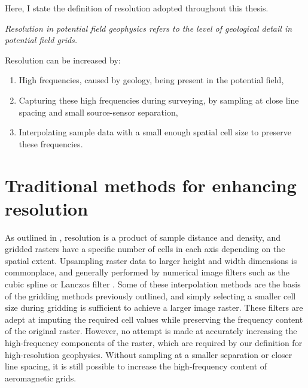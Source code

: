 Here, I state the definition of resolution adopted throughout this thesis.

\bigskip{}
\noindent{}\emph{Resolution in potential field geophysics refers to the level of geological detail in potential field grids.}
\bigskip{}

Resolution can be increased by:
\begin{enumerate}
    \item{} High frequencies, caused by geology, being present in the potential field,
    \item{} Capturing these high frequencies during surveying, by sampling at close line spacing and small source-sensor separation,
    \item{} Interpolating sample data with a small enough spatial cell size to preserve these frequencies.
\end{enumerate}

%

\section{Traditional methods for enhancing resolution}
As outlined in , resolution is a product of sample distance and density, and gridded rasters have a specific number of cells in each axis depending on the spatial extent.
Upsampling raster data to larger height and width dimensions is commonplace, and generally performed by numerical image filters such as the cubic spline \parencite{keysCubicConvolutionInterpolation1981} or Lanczos filter \parencite{lanczos1988applied}.
Some of these interpolation methods are the basis of the gridding methods previously outlined, and simply selecting a smaller cell size during gridding is sufficient to achieve a larger image raster.
These filters are adept at imputing the required cell values while preserving the frequency content of the original raster.
However, no attempt is made at accurately increasing the high-frequency components of the raster, which are required by our definition for high-resolution geophysics.
Without sampling at a smaller separation or closer line spacing, it is still possible to increase the high-frequency content of aeromagnetic grids.

